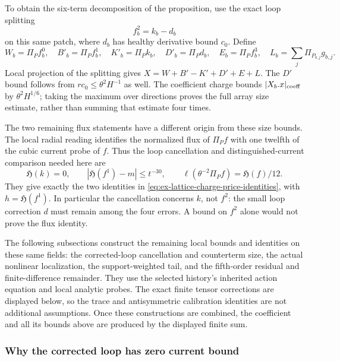 To obtain the six-term decomposition of the proposition, use the exact
loop splitting
\[
 f_b^2=k_b-d_b
\]
on this same patch, where $d_b$ has healthy derivative bound $c_0$.
Define
\[
 W_b=\Pi_P f_b^0,\quad B'_b=\Pi_P f_b^1,\quad
 K'_b=\Pi_P k_b,\quad D'_b=\Pi_P d_b,\quad
 E_b=\Pi_P f_b^3,\quad L_b=\sum_j\Pi_{P_{b,j}}g_{b,j}.
\]
Local projection of the splitting gives $X=W+B'-K'+D'+E+L$.
The $D'$ bound follows from $rc_0\le\theta^2H^{-1}$ as well. The
coefficient charge bounds $|X_b.x|_{\rm coeff}$ by
$\theta^2H^{1/6}$; taking the maximum over directions proves the full
array size estimate, rather than summing that estimate four times.

The two remaining flux statements have a different origin from these
size bounds. The local radial reading identifies the normalized flux of
$\Pi_P f$ with one twelfth of the cubic current probe of $f$. Thus the
loop cancellation and distinguished-current comparison needed here are
\begin{equation}
 \mathfrak H(k)=0,\qquad
 |\mathfrak H(f^1)-m|\le t^{-30},\qquad
 \ell(\theta^{-2}\Pi_P f)=\mathfrak H(f)/12.
 \label{eq:trace-charge-current-identities}
\end{equation}
They give exactly the two identities in
\eqref{eq:ex-lattice-charge-price-identities}, with
$h=\mathfrak H(f^1)$. In particular the cancellation concerns $k$, not
$f^2$: the small loop correction $d$ must remain among the four errors.
A bound on $f^2$ alone would not prove the flux identity.

The following subsections construct the remaining local bounds and
identities on these same fields: the corrected-loop cancellation and
counterterm size, the actual nonlinear localization, the support-weighted
tail, and the fifth-order residual and finite-difference remainder.
They use the selected history's inherited action equation and local
analytic probes. The exact finite tensor corrections are displayed
below, so the trace and antisymmetric calibration identities are not
additional assumptions. Once these constructions are combined, the
coefficient and all its bounds above are produced by the displayed
finite sum.

\subsubsection{Why the corrected loop has zero current bound}
\label{subsec:trace-charge-loop-cancellation}

